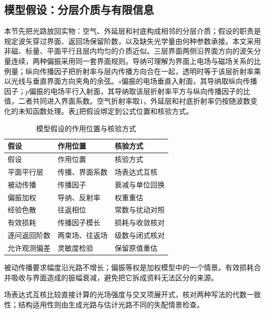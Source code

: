 \subsection{模型假设：分层介质与有限信息}

本节先把光路放回实物：空气、外延层和衬底构成相邻的分层介质；假设的职责是规定波矢穿过界面、返回场保留阶数，以及缺失光学量由何种参数承接。本文采用非磁、标量、平面平行且层内均匀的介质近似。三层界面两侧沿界面方向的波矢分量连续，两种偏振采用同一套界面规则。导纳可理解为界面上电场与磁场关系的比例量；纵向传播因子把折射率与层内传播方向合在一起，透明时等于该层折射率乘以光线与垂直界面方向夹角的余弦。$s$偏振的电场垂直入射面，其导纳取纵向传播因子；$p$偏振的电场平行入射面，其导纳取该层折射率平方与纵向传播因子的比值，二者共同进入界面系数。空气折射率取$1$，外延层和衬底折射率仍按随波数变化的未知函数处理。表\ref{tab:02}把假设绑定到公式位置和核验方式。
\begingroup
{}
\setlength{\tabcolsep}{3pt}
\begin{longtable}{>{\centering\arraybackslash}p{} >{\centering\arraybackslash}p{} >{\centering\arraybackslash}p{}}
\caption{模型假设的作用位置与核验方式}\label{tab:02}\\
\hline
假设 & 作用位置 & 核验方式\\
\hline
\endfirsthead
\hline
假设 & 作用位置 & 核验方式\\
\hline
\endhead
平面平行层 & 传播、界面系数 & 场表达式互核\\
被动传播 & 传播因子 & 衰减与单位回换\\
偏振加权 & 导纳、反射率 & 权重重估\\
经验色散 & 往返相位 & 常数与扰动对照\\
有效损耗 & 传播因子模长 & 损耗与收敛核对\\
逐问返回阶数 & 两束场、往返场 & 级数与闭式核对\\
允许观测偏差 & 灵敏度检验 & 保留原值重估\\
\hline
\end{longtable}
\endgroup

被动传播要求幅度沿光路不增长；偏振等权是加权模型中的一个情景。有效损耗合并吸收与界面造成的振幅衰减，避免把它拆成资料无法区分的来源。

场表达式互核比较直接计算的光场强度与交叉项展开式，核对两种写法的代数一致性；结构适用性则由生成光路与估计光路不同的失配情景检查。

